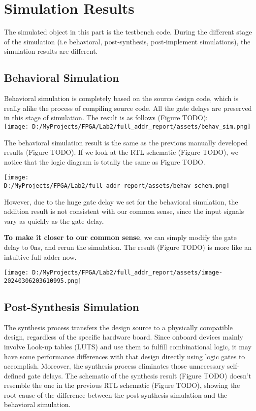 \documentclass[
]{article}
\begin{document}
\hypertarget{simulation-results}{%
\section{Simulation Results}\label{simulation-results}}

The simulated object in this part is the testbench code. During the
different stage of the simulation (i.e behavioral, post-synthesis,
post-implement simulations), the simulation results are different.

\hypertarget{behavioral-simulation}{%
\subsection{Behavioral Simulation}\label{behavioral-simulation}}

Behavioral simulation is completely based on the source design code,
which is really alike the process of compiling source code. All the gate
delays are preserved in this stage of simulation. The result is as
follows (Figure TODO):\\
\texttt{[image: D:/MyProjects/FPGA/Lab2/full\_addr\_report/assets/behav\_sim.png]}

The behavioral simulation result is the same as the previous manually
developed results (Figure TODO). If we look at the RTL schematic (Figure
TODO), we notice that the logic diagram is totally the same as Figure
TODO.

\texttt{[image: D:/MyProjects/FPGA/Lab2/full\_addr\_report/assets/behav\_schem.png]}

However, due to the huge gate delay we set for the behavioral
simulation, the addition result is not consistent with our common sense,
since the input signals vary as quickly as the gate delay.

\textbf{To make it closer to our common sense}, we can simply modify the
gate delay to 0ns, and rerun the simulation. The result (Figure TODO) is
more like an intuitive full adder now.

\texttt{[image: D:/MyProjects/FPGA/Lab2/full\_addr\_report/assets/image-20240306203610995.png]}

\hypertarget{post-synthesis-simulation}{%
\subsection{Post-Synthesis Simulation}\label{post-synthesis-simulation}}

The synthesis process transfers the design source to a physically
compatible design, regardless of the specific hardware board. Since
onboard devices mainly involve Look-up tables (LUTS) and use them to
fulfill combinational logic, it may have some performance differences
with that design directly using logic gates to accomplish. Moreover, the
synthesis process eliminates those unnecessary self-defined gate delays.
The schematic of the synthesis result (Figure TODO) doesn't resemble the
one in the previous RTL schematic (Figure TODO), showing the root cause
of the difference between the post-synthesis simulation and the
behavioral simulation.
\end{document}
